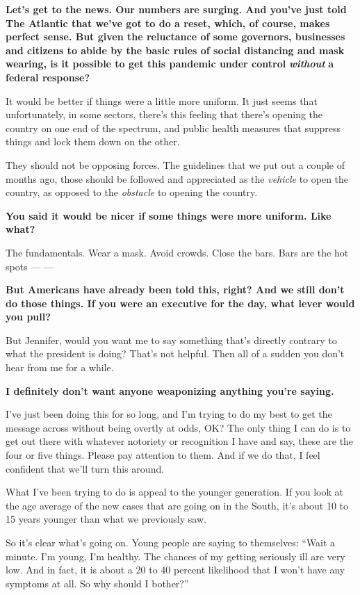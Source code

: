 \textbf{Let's get to the news. Our numbers are surging. And you've just
told The Atlantic that we've got to do a reset, which, of course, makes
perfect sense. But given the reluctance of some governors, businesses
and citizens to abide by the basic rules of social distancing and mask
wearing, is it possible to get this pandemic under control}
\emph{\textbf{without}} \textbf{a federal response?}

It would be better if things were a little more uniform. It just seems
that unfortunately, in some sectors, there's this feeling that there's
opening the country on one end of the spectrum, and public health
measures that suppress things and lock them down on the other.

They should not be opposing forces. The guidelines that we put out a
couple of months ago, those should be followed and appreciated as the
\emph{vehicle} to open the country, as opposed to the \emph{obstacle} to
opening the country.

\textbf{You said it would be nicer if some things were more uniform.
Like what?}

The fundamentals. Wear a mask. Avoid crowds. Close the bars. Bars are
the hot spots --- ---

\textbf{But Americans have already been told this, right? And we still
don't do those things. If you were an executive for the day, what lever
would you pull?}

But Jennifer, would you want me to say something that's directly
contrary to what the president is doing? That's not helpful. Then all of
a sudden you don't hear from me for a while.

\textbf{I definitely don't want anyone weaponizing anything you're
saying.}

I've just been doing this for so long, and I'm trying to do my best to
get the message across without being overtly at odds, OK? The only thing
I can do is to get out there with whatever notoriety or recognition I
have and say, these are the four or five things. Please pay attention to
them. And if we do that, I feel confident that we'll turn this around.

What I've been trying to do is appeal to the younger generation. If you
look at the age average of the new cases that are going on in the South,
it's about 10 to 15 years younger than what we previously saw.

So it's clear what's going on. Young people are saying to themselves:
``Wait a minute. I'm young, I'm healthy. The chances of my getting
seriously ill are very low. And in fact, it is about a 20 to 40 percent
likelihood that I won't have any symptoms at all. So why should I
bother?''

